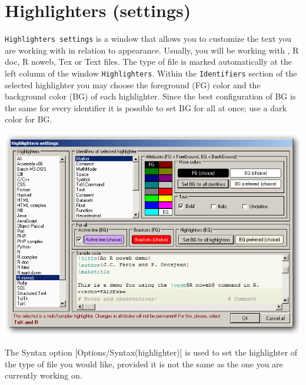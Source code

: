 
\section{Highlighters (settings)}

\texttt{Highlighters settings} is a window that allows you to customize the text you are working with in relation to appearance.
Usually, you will be working with \RR{}, R doc, R noweb, Tex or Text files.
The type of file is marked automatically at the left column of the window \texttt{Highlighters}.
Within the \texttt{Identifiers} section of the selected highlighter you may choose the foreground (FG)
color and the background color (BG) of each highlighter. Since the best configuration of BG is the same for every
identifier it is possible to set BG for all at once; use a dark color for BG.

\includegraphics[scale=0.50]{./res/highlighter_settings.png}

The Syntax option [Options/Syntax(highlighter)] is used to set the highlighter of the type of file you would like,
provided it is not the same as the one you are currently working on.
